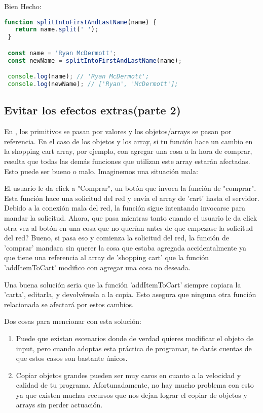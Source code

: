 Bien Hecho:
\begin{lstlisting}[language=TypeScript, style=goodstyle]
 function splitIntoFirstAndLastName(name) {
   return name.split(' ');
 }

 const name = 'Ryan McDermott';
 const newName = splitIntoFirstAndLastName(name);

 console.log(name); // 'Ryan McDermott';
 console.log(newName); // ['Ryan', 'McDermott'];
\end{lstlisting}

\subsection*{Evitar los efectos extras(parte 2)}

En , los primitivos se pasan por valores y los objetos/arrays se pasan por referencia. En el caso de los objetos y los array, si tu función hace un cambio en la shopping cart array, por ejemplo, con agregar una cosa a la hora de comprar, resulta que todas las demás funciones que utilizan este array estarán afectadas. Esto puede ser bueno o malo. Imaginemos una situación mala:

El usuario le da click a "Comprar", un botón que invoca la función de "comprar". Esta función hace una solicitud del red y envía el array de 'cart' hasta el servidor. Debido a la conexión mala del red, la función sigue intentando invocarse para mandar la solicitud. Ahora, que pasa mientras tanto cuando el usuario le da click otra vez al botón en una cosa que no querían antes de que empezase la solicitud del red? Bueno, si pasa eso y comienza la solicitud del red, la función de 'comprar' mandara sin querer la cosa que estaba agregada accidentalmente ya que tiene una referencia al array de 'shopping cart' que la función 'addItemToCart' modifico con agregar una cosa no deseada.

Una buena solución seria que la función 'addItemToCart' siempre copiara la 'carta', editarla, y devolvérsela a la copia. Esto asegura que ninguna otra función relacionada se afectará por estos cambios.

Dos cosas para mencionar con esta solución:

\begin{enumerate}
  \item Puede que existan escenarios donde de verdad quieres modificar el objeto de input, pero cuando adoptas esta práctica de programar, te darás cuentas de que estos casos son bastante únicos.
  \item Copiar objetos grandes pueden ser muy caros en cuanto a la velocidad y calidad de tu programa. Afortunadamente, no hay mucho problema con esto ya que existen muchas recursos que nos dejan lograr el copiar de objetos y arrays sin perder actuación.
\end{enumerate}

